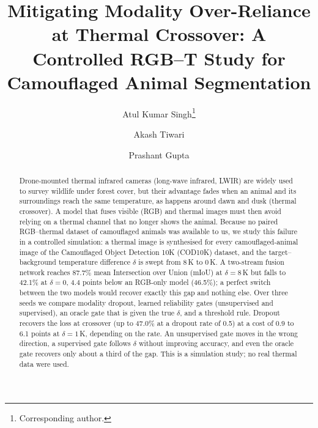 \documentclass[runningheads]{llncs}
\begin{document}
\title{Mitigating Modality Over-Reliance at Thermal Crossover: A Controlled RGB–T Study for Camouflaged Animal Segmentation}

\author{Atul Kumar Singh\thanks{Corresponding author.} \and Akash Tiwari \and Prashant Gupta}


\maketitle

\begin{abstract}
Drone-mounted thermal infrared cameras (long-wave infrared, LWIR) are widely used to survey wildlife under forest cover, but their advantage fades when an animal and its surroundings reach the same temperature, as happens around dawn and dusk (thermal crossover). A model that fuses visible (RGB) and thermal images must then avoid relying on a thermal channel that no longer shows the animal. Because no paired RGB--thermal dataset of camouflaged animals was available to us, we study this failure in a controlled simulation: a thermal image is synthesised for every camouflaged-animal image of the Camouflaged Object Detection 10K (COD10K) dataset, and the target--background temperature difference $\delta$ is swept from 8\,K to 0\,K. A two-stream fusion network reaches 87.7\% mean Intersection over Union (mIoU) at $\delta=8$\,K but falls to 42.1\% at $\delta=0$, 4.4 points below an RGB-only model (46.5\%); a perfect switch between the two models would recover exactly this gap and nothing else. Over three seeds we compare modality dropout, learned reliability gates (unsupervised and supervised), an oracle gate that is given the true $\delta$, and a threshold rule. Dropout recovers the loss at crossover (up to 47.0\% at a dropout rate of 0.5) at a cost of 0.9 to 6.1 points at $\delta=1$\,K, depending on the rate. An unsupervised gate moves in the wrong direction, a supervised gate follows $\delta$ without improving accuracy, and even the oracle gate recovers only about a third of the gap. This is a simulation study; no real thermal data were used.
\end{abstract}
\end{document}
